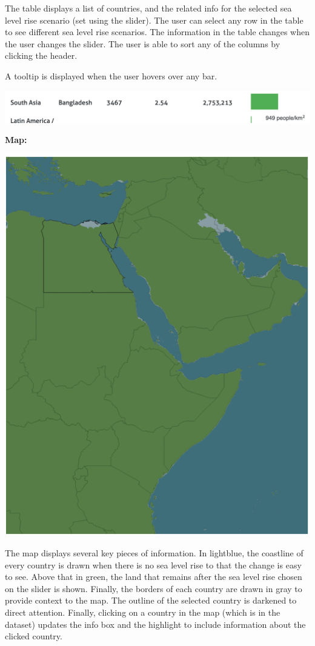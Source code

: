 \documentclass[12pt]{article}
\begin{document}
		The table displays a list of countries, and the related info for the selected sea level rise scenario (set using the slider).
		The user can select any row in the table to see different sea level rise scenarios.
		The information in the table changes when the user changes the slider.
		The user is able to sort any of the columns by clicking the header.

		A tooltip is displayed when the user hovers over any bar.

		\includegraphics[scale=0.4]{images/tooltip.png}
		\newline

		\textbf{Map:}
		\newline

		\includegraphics[scale=0.4]{images/map.png}
		\newline

		The map displays several key pieces of information.
		In lightblue, the coastline of every country is drawn when there is no sea level rise to that the change is easy to see.
		Above that in green, the land that remains after the sea level rise chosen on the slider is shown.
		Finally, the borders of each country are drawn in gray to provide context to the map.
		The outline of the selected country is darkened to direct attention.
		Finally, clicking on a country in the map (which is in the dataset) updates the info box and the highlight to include information about the clicked country.
\end{document}
